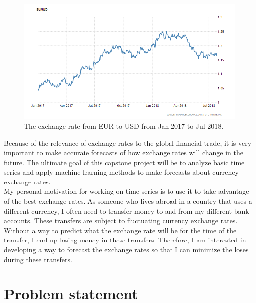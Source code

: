\documentclass[10pt,a4paper]{article}
\begin{document}
\begin{figure}[h]
\begin{center}
\includegraphics[scale=0.5]{EURUSD.png}
\caption{The exchange rate from EUR to USD from Jan 2017 to Jul 2018.}
\label{fig:EURUSD example}
\centering
\end{center}
\end{figure}

Because of the relevance of exchange rates to the global financial trade, it is very important to make accurate forecasts of how exchange rates will change in the future. The ultimate goal of this capstone project will be to analyze basic time series and apply machine learning methods to make forecasts about currency exchange rates.\\


My personal motivation for working on time series is to use it to take advantage of the best exchange rates. As someone who lives abroad in a country that uses a different currency, I often need to transfer money to and from my different bank accounts. These transfers are subject to fluctuating currency exchange rates. Without a way to predict what the exchange rate will be for the time of the transfer, I end up losing money in these transfers. Therefore, I am interested in developing a way to forecast the exchange rates so that I can minimize the loses during these transfers.   



\section{Problem statement}
\end{document}
